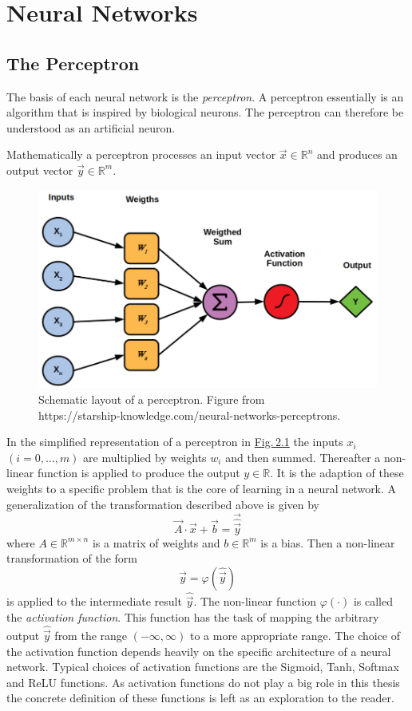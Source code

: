 \section{Neural Networks}
\subsection{The Perceptron}
The basis of each neural network is the \textit{perceptron}. A perceptron essentially is an algorithm that is inspired by biological neurons. The perceptron can therefore be understood as an artificial neuron.

Mathematically a perceptron processes an input vector $\vec{x}\in\mathbb{R}^n$ and produces an output vector $\vec{y}\in\mathbb{R}^m$. 
%
\begin{figure} \label{fig:2.1}
    \centering
    \includegraphics[width=.5\textwidth]{Chapters/figures/perceptron.PNG}
    \caption[Schematic layout of a perceptron]{Schematic layout of a perceptron. Figure from\\ https://starship-knowledge.com/neural-networks-perceptrons.}
\end{figure}
%
In the simplified representation of a perceptron in \hyperref[fig:2.1]{Fig.\,2.1} the inputs $x_i$ $ (i=0,\dots,m)$ are multiplied by weights $w_i$ and then summed. Thereafter a non-linear function is applied to produce the output $y\in\mathbb{R}$. It is the adaption of these weights to a specific problem that is the core of learning in a neural network. A generalization of the transformation described above is given by
%
\begin{equation} \label{equ:2.1}
    \vec{A}\cdot\vec{x}+\vec{b}=\vec{\hat{\vec{y}}}
\end{equation}
%
where $A\in\mathbb{R}^{m\times n}$ is a matrix of weights and $b\in\mathbb{R}^m$ is a bias. Then a non-linear transformation of the form
%
\begin{equation} \label{equ:2.2}
    \vec{y}=\varphi(\hat{\vec{y}})
\end{equation}
%
is applied to the intermediate result $\hat{\vec{y}}$. The non-linear function $\varphi(\cdot)$ is called the \textit{activation function}. This function has the task of mapping the arbitrary output $\hat{\vec{y}}$ from the range $(-\infty,\infty)$ to a more appropriate range. The choice of the activation function depends heavily on the specific architecture of a neural network. Typical choices of activation functions are the Sigmoid, Tanh, Softmax and ReLU functions. As activation functions do not play a big role in this thesis the concrete definition of these functions is left as an exploration to the reader.
%
